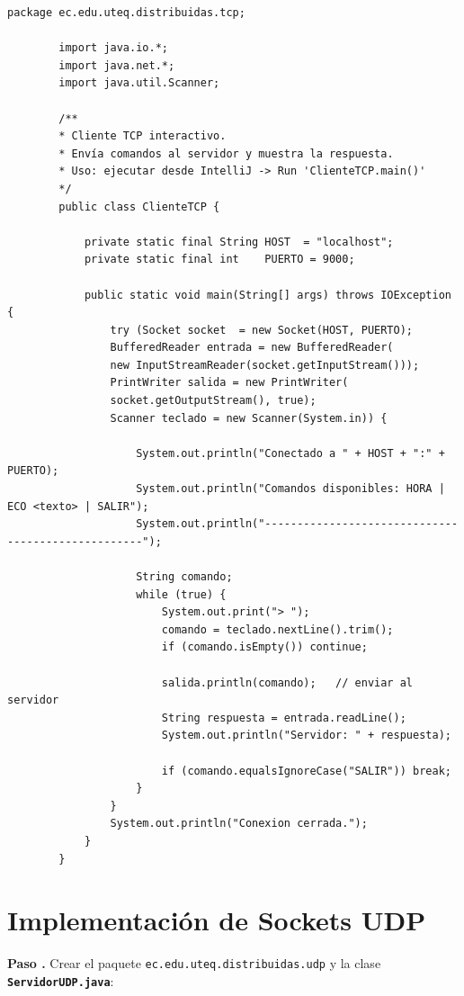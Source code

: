 \documentclass[12pt, a4paper, openany]{book}
\newcounter{paso}[section]
\newcommand{\paso}[1]{%
	\stepcounter{paso}%
	\medskip\noindent
	\begin{tcolorbox}[enhanced, colback=white, colframe=practiceBlue,
		boxrule=0.8pt, arc=3pt, left=6pt, right=6pt, top=4pt, bottom=4pt,
		before upper={\noindent}]
		\textcolor{practiceBlue}{\textbf{Paso \arabic{paso}.}} #1
	\end{tcolorbox}%
}
\newcommand{\code}[1]{\texttt{\small#1}}
\newcommand{\archivo}[1]{\texttt{\textbf{#1}}}
\begin{document}
	\begin{lstlisting}[style=JavaStyle, caption={ClienteTCP.java --- Cliente interactivo}]
		package ec.edu.uteq.distribuidas.tcp;
		
		import java.io.*;
		import java.net.*;
		import java.util.Scanner;
		
		/**
		* Cliente TCP interactivo.
		* Envía comandos al servidor y muestra la respuesta.
		* Uso: ejecutar desde IntelliJ -> Run 'ClienteTCP.main()'
		*/
		public class ClienteTCP {
			
			private static final String HOST  = "localhost";
			private static final int    PUERTO = 9000;
			
			public static void main(String[] args) throws IOException {
				try (Socket socket  = new Socket(HOST, PUERTO);
				BufferedReader entrada = new BufferedReader(
				new InputStreamReader(socket.getInputStream()));
				PrintWriter salida = new PrintWriter(
				socket.getOutputStream(), true);
				Scanner teclado = new Scanner(System.in)) {
					
					System.out.println("Conectado a " + HOST + ":" + PUERTO);
					System.out.println("Comandos disponibles: HORA | ECO <texto> | SALIR");
					System.out.println("---------------------------------------------------");
					
					String comando;
					while (true) {
						System.out.print("> ");
						comando = teclado.nextLine().trim();
						if (comando.isEmpty()) continue;
						
						salida.println(comando);   // enviar al servidor
						String respuesta = entrada.readLine();
						System.out.println("Servidor: " + respuesta);
						
						if (comando.equalsIgnoreCase("SALIR")) break;
					}
				}
				System.out.println("Conexion cerrada.");
			}
		}
	\end{lstlisting}
	
	\section{Implementación de Sockets UDP}
	
	\paso{Crear el paquete \code{ec.edu.uteq.distribuidas.udp} y la clase
		\archivo{ServidorUDP.java}:}
	
\end{document}
